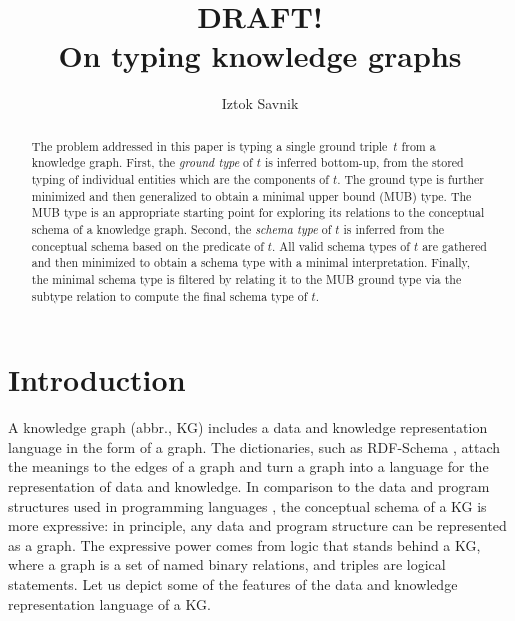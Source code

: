 \documentclass[runningheads]{llncs}
\begin{document}
\title{DRAFT! \\ On typing knowledge graphs}

\author{Iztok Savnik} 



\maketitle

\begin{abstract}
  The problem addressed in this paper is typing a single ground
  triple~$t$ from a knowledge graph. First, the \emph{ground type} of
  $t$ is inferred bottom-up, from the stored typing of individual
  entities which are the components of $t$. The ground type is further
  minimized and then generalized to obtain a minimal upper bound (MUB)
  type. The MUB type is an appropriate starting point for exploring
  its relations to the conceptual schema of a knowledge graph. Second,
  the \emph{schema type} of $t$ is inferred from the conceptual schema
  based on the predicate of $t$. All valid schema types of $t$ are
  gathered and then minimized to obtain a schema type with a minimal
  interpretation. Finally, the minimal schema type is filtered by
  relating it to the MUB ground type via the subtype relation to
  compute the final schema type of $t$.

\end{abstract}


\thispagestyle{headings}




\section{Introduction}

A knowledge graph (abbr., KG) includes a data and knowledge
representation language in the form of a graph. The dictionaries, such
as RDF-Schema \cite{rdfschema}, attach the meanings to the edges of a
graph and turn a graph into a language for the representation of data
and knowledge. In comparison to the data and program structures used
in programming languages \cite{Pierce2002,Hindley1997}, the conceptual
schema of a KG is more expressive: in principle, any data and program
structure can be represented as a graph. The expressive power comes
from logic that stands behind a KG, where a graph is a set of named
binary relations, and triples are logical statements. Let us depict
some of the features of the data and knowledge representation language
of a KG.
\end{document}
